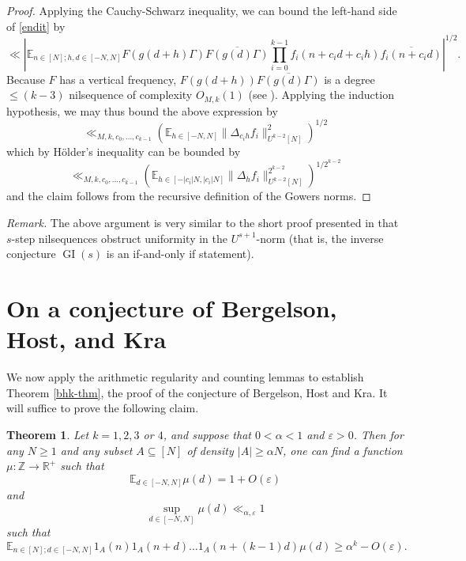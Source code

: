 \documentclass[11pt,reqno]{amsart}
\numberwithin{equation}{section}
\theoremstyle{plain}
\newtheorem{theorem}[subsection]{Theorem}
\theoremstyle{definition}
\renewcommand{\leq}{\leqslant}
\renewcommand{\geq}{\geqslant}
\newcommand\E{{\mathbb{E}}}
\newcommand\Z{\mathbb{Z}}
\newcommand\R{\mathbb{R}}
\newcommand\1{{\bf 1}}
\newcommand\2{{\bf 2}}
\newcommand\eps{\varepsilon}
\newcommand\GI{\operatorname{GI}}
\begin{document}
\begin{proof}
Applying the Cauchy-Schwarz inequality, we can bound the left-hand side of \eqref{endit} by
$$
\ll |\E_{n \in [N]; h,d \in [-N,N]} F(g(d+h)\Gamma) \overline{F(g(d)\Gamma)}
\prod_{i=0}^{k-1} f_i(n + c_i d + c_i h) \overline{f_i(n + c_i d)}|^{1/2}.$$
Because $F$ has a vertical frequency, $F(g(d+h))\overline{F(g(d)\Gamma)}$ is a degree $\leq (k-3)$ nilsequence of complexity $O_{M,k}(1)$ (see \cite[Proposition 7.2]{green-tao-nilratner}).  Applying the induction hypothesis, we may thus bound the above expression by
$$ \ll_{M,k,c_0,\ldots,c_{k-1}} (\E_{h \in [-N,N]} \| \Delta_{c_i h} f_i \|_{U^{k-2}[N]}^2)^{1/2}$$
which by H\"older's inequality can be bounded by
$$ \ll_{M,k,c_0,\ldots,c_{k-1}} (\E_{h \in [-|c_i|N,|c_i|N]} \| \Delta_{h} f_i \|_{U^{k-2}[N]}^{2^{k-2}})^{1/2^{k-2}}$$
and the claim follows from the recursive definition of the Gowers norms.
\end{proof}

\emph{Remark.} The above argument is very similar to the short proof presented in \cite[Appendix G]{green-tao-ziegler-u4inverse} that $s$-step nilsequences obstruct uniformity in the $U^{s+1}$-norm (that is, the inverse conjecture $\GI(s)$ is an if-and-only if statement).


\section{On a conjecture of Bergelson, Host, and Kra}\label{bhk-sec}

We now apply the arithmetic regularity and counting lemmas to establish Theorem \ref{bhk-thm}, the proof of the conjecture of Bergelson, Host and Kra.  It will suffice to prove the following claim.

\begin{theorem}\label{bhk-thm2}  Let $k = 1, 2, 3$ or $4$, and suppose that $0 < \alpha < 1$ and $\eps > 0$.  Then for any $N \geq 1$ and any subset $A \subseteq [N]$ of density $|A| \geq \alpha N$, one can find a function $\mu: \Z \to \R^+$ such that
\begin{equation}\label{mudi}
\E_{d \in [-N,N]} \mu(d) = 1 + O(\eps)
\end{equation}
and
\begin{equation}\label{mudi-2}
 \sup_{d \in [-N,N]} \mu(d) \ll_{\alpha,\eps} 1
\end{equation}
such that
\begin{equation}\label{mudi-3}
 \E_{n \in [N]; d \in [-N,N]} 1_A(n) 1_A(n+d) \ldots 1_A(n+(k-1)d) \mu(d) \geq \alpha^k - O(\eps).
\end{equation}
\end{theorem}
\end{document}
